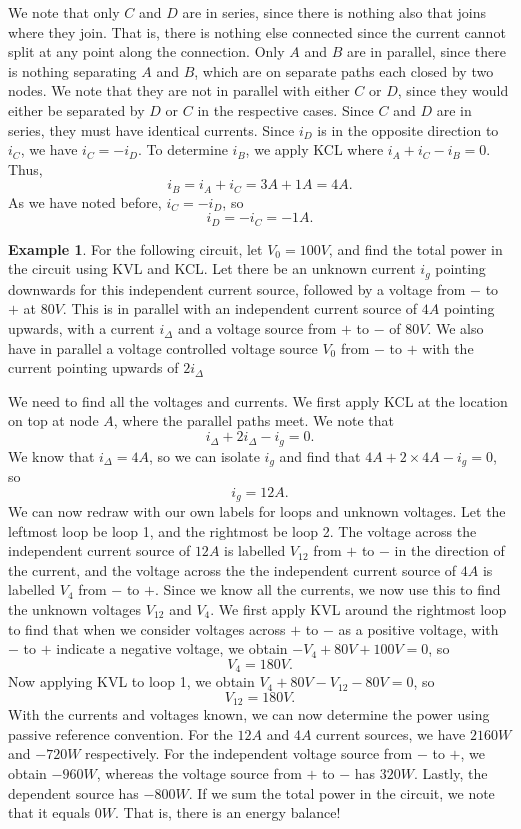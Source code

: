 \documentclass[11pt]{article}
\theoremstyle{plain} %
\theoremstyle{definition}
\theoremstyle{example}
\newtheorem*{example}{Example}
\theoremstyle{remark}
\begin{document}
We note that only $C$ and $D$ are in series, since there is nothing also that joins where they join. That is, there is nothing else connected since the current cannot split at any point along the connection. Only $A$ and $B$ are in parallel, since there is nothing separating $A$ and $B$, which are on separate paths each closed by two nodes. We note that they are not in parallel with either $C$ or $D$, since they would either be separated by $D$ or $C$ in the respective cases. Since $C$ and $D$ are in series, they must have identical currents. Since $i_D$ is in the opposite direction to $i_C$, we have $i_C = -i_D$. To determine $i_B$, we apply KCL where $i_A + i_C - i_B = 0$. Thus, 
$$i_B = i_A + i_C = 3A + 1A = 4A.$$ As we have noted before, $i_C = -i_D$, so 
$$i_D = -i_C = -1A.$$

\begin{example}
For the following circuit, let $V_0 = 100V$, and find the total power in the circuit using KVL and KCL. 
Let there be an unknown current $i_g$ pointing downwards for this independent current source, followed by a voltage from $-$ to $+$ at $80V$. This is in parallel with an independent current source of $4A$ pointing upwards, with a current $i_{\Delta}$ and a voltage source from $+$ to $-$ of $80V$. We also have in parallel a voltage controlled voltage source $V_0$ from $-$ to $+$ with the current pointing upwards of $2i_{\Delta}$
\end{example}

We need to find all the voltages and currents. We first apply KCL at the location on top at node $A$, where the parallel paths meet. We note that 
$$i_{\Delta} + 2i_{\Delta} -i_g = 0.$$
We know that $i_{\Delta} = 4A$, so we can isolate $i_g$ and find that $4A + 2\times 4A -i_g = 0$, so 
$$i_g = 12A.$$
We can now redraw with our own labels for loops and unknown voltages. Let the leftmost loop be loop 1, and the rightmost be loop 2. The voltage across the independent current source of $12A$ is labelled $V_{12}$ from $+$ to $-$ in the direction of the current, and the voltage across the the independent current source of $4A$ is labelled $V_4$ from $-$ to $+$. Since we know all the currents, we now use this to find the unknown voltages $V_{12}$ and $V_4$.  We first apply KVL around the rightmost loop to find that when we consider voltages across $+$ to $-$ as a positive voltage, with $-$ to $+$ indicate a negative voltage, we obtain $-V_4 + 80V + 100V = 0$, so
$$V_4 = 180V.$$
Now applying KVL to loop 1, we obtain $V_4 + 80V - V_{12}-80V = 0$, so
$$V_{12} = 180V.$$
With the currents and voltages known, we can now determine the power using passive reference convention.            For the $12A$ and $4A$ current sources, we have $2160W$ and $-720W$ respectively. For the independent voltage source from $-$ to $+$, we obtain $-960W$, whereas the voltage source from $+$ to $-$ has $320W$. Lastly, the dependent source has $-800W$. If we sum the total power in the circuit, we note that it equals $0W$. That is, there is an energy balance!
\end{document}
